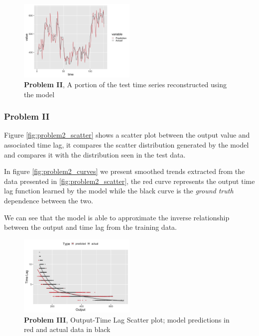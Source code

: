 \documentclass[twoside]{article}
\begin{document}
\begin{figure}[h]
\vspace{.3in}
\centerline{\includegraphics[width=0.5\textwidth]{figures/exp2_timeseries_pred.png}}
\vspace{.3in}
\caption{\textbf{Problem II}, A portion of the test time series reconstructed using the model}
\label{fig:problem2_timeseries}
\end{figure}


\subsubsection{Problem II}

Figure \ref{fig:problem2_scatter} shows a scatter plot between the output value and associated time lag, it compares the scatter distribution generated by the model and compares it with the distribution seen in the test data. 

In figure \ref{fig:problem2_curves} we present smoothed trends extracted from the data presented in \ref{fig:problem2_scatter}, the red curve represents the output time lag function learned by the model while the black curve is the \emph{ground truth} dependence between the two. 

We can see that the model is able to approximate the inverse relationship between the output and time lag from the training data.

\begin{figure}[h]
\vspace{.3in}
\centerline{\includegraphics[width=0.5\textwidth]{figures/exp3_scatter_v_tl.png}}
\vspace{.3in}
\caption{\textbf{Problem III}, Output-Time Lag Scatter plot; model predictions in red and actual data in black}
\label{fig:problem3_scatter}
\end{figure}
\end{document}
